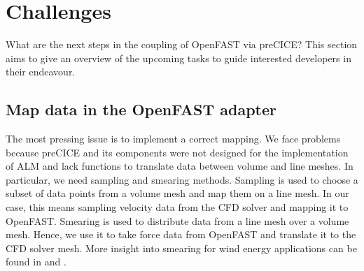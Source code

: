 \section{Challenges}
\label{section:challenges}

What are the next steps in the coupling of OpenFAST via preCICE? This section aims to give an overview of the upcoming tasks to guide interested developers in their endeavour.

\subsection{Map data in the OpenFAST adapter}

\begin{comment}
\begin{itemize}
	\item preCICE and its adapters were not designed for the implementation of ALM
	\item mapping in preCICE does not include sufficient functions to translate between volume and line mesh
	\item We need sampling and smearing methods to connect them
	\item See aspast.cpp on how this could be done in the OpenFAST adapter
	\item Problems
	\begin{itemize}
		\item What to do with the internal preCICE mapping? Use only for data transfer? Feels weird and error-prone
		\item Which mesh to use in preCICE for FAST? The same fluid mesh as for FOAM. Coupling scheme needs to be changed
		\item Possibility to include such methods in preCICE internally? Unlikely
	\end{itemize}
\end{itemize}
\end{comment}

The most pressing issue is to implement a correct mapping. We face problems because preCICE and its components were not designed for the implementation of ALM and lack functions to translate data between volume and line meshes.
In particular, we need sampling and smearing methods. Sampling is used to choose a subset of data points from a volume mesh and map them on a line mesh. In our case, this means sampling velocity data from the CFD solver and mapping it to OpenFAST.
Smearing is used to distribute data from a line mesh over a volume mesh. Hence, we use it to take force data from OpenFAST and translate it to the CFD solver mesh. More insight into smearing for wind energy applications can be found in  \cite{Jha:2014} and \cite{Meyer:2019}.\\

